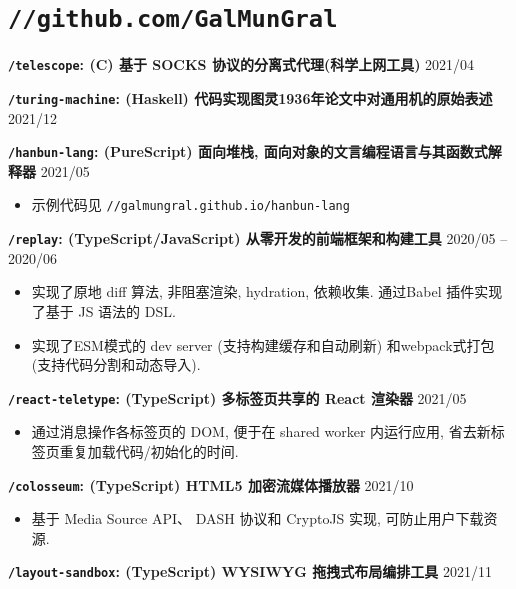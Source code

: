 \documentclass[10pt]{article}
\begin{document}
\section*{\texttt{\large //github.com/GalMunGral}}

\textbf{\texttt{/telescope}:  (C) 基于 SOCKS 协议的分离式代理(科学上网工具)}   \hfill 2021/04

\vspace{0.5em}
\textbf{\texttt{/turing-machine}:  (Haskell) 代码实现图灵1936年论文中对通用机的原始表述} \hfill 2021/12

\vspace{0.5em}
\textbf{\texttt{/hanbun-lang}: (PureScript) 面向堆栈, 面向对象的文言编程语言与其函数式解释器} \hfill 2021/05
\begin{itemize}
\item 示例代码见 \texttt{//galmungral.github.io/hanbun-lang}
\end{itemize}

\vspace{0.5em}
\textbf{\texttt{/replay}: (TypeScript/JavaScript)  从零开发的前端框架和构建工具 } \hfill 2020/05 -- 2020/06
\begin{itemize}
\item 实现了原地 diff 算法, 非阻塞渲染, hydration, 依赖收集. 通过Babel 插件实现了基于 JS 语法的 DSL.
\item 实现了ESM模式的 dev server (支持构建缓存和自动刷新) 和webpack式打包 (支持代码分割和动态导入).
\end{itemize}

\vspace{0.5em}
\textbf{\texttt{/react-teletype}:  (TypeScript) 多标签页共享的 React 渲染器} \hfill 2021/05 
\begin{itemize}
\item  通过消息操作各标签页的 DOM, 便于在 shared worker 内运行应用, 省去新标签页重复加载代码/初始化的时间.
\end{itemize}

\vspace{0.5em}
\textbf{\texttt{/colosseum}:  (TypeScript) HTML5 加密流媒体播放器}   \hfill 2021/10
\begin{itemize}
\item 基于 Media Source API、 DASH 协议和 CryptoJS 实现, 可防止用户下载资源.
\end{itemize}

\vspace{0.5em}
\textbf{\texttt{/layout-sandbox}: (TypeScript) WYSIWYG 拖拽式布局编排工具} \hfill 2021/11
\end{document}
